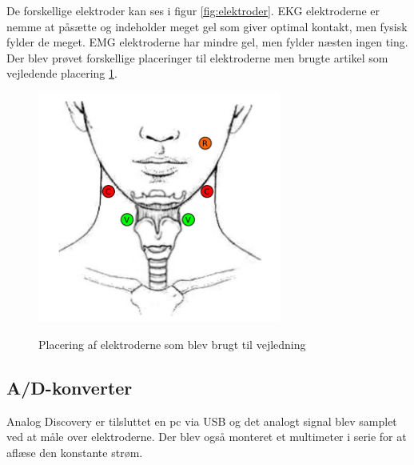 De forskellige elektroder kan ses i figur \ref{fig:elektroder}. EKG elektroderne er nemme at påsætte og indeholder meget gel som giver optimal kontakt, men fysisk fylder de meget. EMG elektroderne har mindre gel, men fylder næsten ingen ting. Der blev prøvet forskellige placeringer til elektroderne men brugte artikel \cite{Nahrstaedt2012a} som vejledende placering \ref{fig:elektrodeplaceringREF}. 


\begin{figure}[H]
\centering
{\includegraphics[width=8cm]
{Figure/elektrodeplaceringREF}}
\caption{Placering af elektroderne som blev brugt til vejledning\cite{Nahrstaedt2012a}}
\label{fig:elektrodeplaceringREF}
\end{figure}





\subsection{A/D-konverter}

Analog Discovery er tilsluttet en pc via USB og det analogt signal blev samplet ved at måle over elektroderne. Der blev også monteret et multimeter i serie for at aflæse den konstante strøm.


